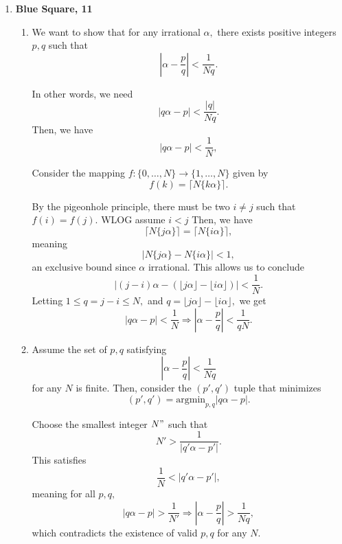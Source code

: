 \documentclass[12pt]{article}
\begin{document}
\begin{enumerate}
    Thus, by the pigeonhole principle there must be at least one
    consecutive non-empty block that is a perfect square.

  \item \textbf{Blue Square, 11}
    \begin{enumerate}
      \item We want to show that for any irrational $\alpha,$ there
        exists positive integers $p, q$ such that
        $$
        \left|\alpha - \dfrac{p}{q}\right| < \dfrac{1}{Nq}.
        $$

        In other words, we need
        $$
        |q\alpha - p| < \dfrac{|q|}{Nq}.
        $$
        Then, we have
        $$
        |q \alpha - p| < \dfrac{1}{N},
        $$

        Consider the mapping $f : \{0, \ldots, N\} \to \{1, \ldots,
        N\}$ given by
        $$
        f(k) = \lceil N \{k \alpha\} \rceil.
        $$

        By the pigeonhole principle, there must be two $i \neq j$
        such that $f(i) = f(j).$ WLOG assume $i < j$ Then, we have
        $$
        \lceil N\{j \alpha\} \rceil = \lceil N\{i \alpha \}\rceil,
        $$
        meaning
        $$
        |N\{j \alpha\}-N\{i \alpha\}| < 1,
        $$
        an exclusive bound since $\alpha$ irrational. This allows us to conclude
        $$
        | (j-i) \alpha - (\lfloor j \alpha \rfloor - \lfloor i \alpha
        \rfloor)| < \dfrac{1}{N}.
        $$
        Letting $1 \leq q = j - i \leq N,$ and $q = \lfloor j \alpha
        \rfloor - \lfloor i \alpha \rfloor,$ we get
        $$
        |q \alpha - p| < \dfrac{1}{N} \Rightarrow \left|\alpha -
        \dfrac{p}{q}\right| < \dfrac{1}{qN}.
        $$

      \item Assume the set of $p, q$ satisfying
        $$
        \left|\alpha  - \dfrac{p}{q}\right| < \dfrac{1}{Nq}
        $$
        for any $N$ is finite. Then, consider the $(p', q')$ tuple
        that minimizes
        $$
        (p', q') = \text{argmin}_{p, q} \left|q\alpha - p\right|.
        $$

        Choose the smallest integer $N"$ such that $$N' >
        \dfrac{1}{|q'\alpha - p'|}.$$ This satisfies
        $$
        \dfrac{1}{N} < \left|q'\alpha - p'\right|,
        $$
        meaning for all $p, q,$
        $$
        |q\alpha - p| > \dfrac{1}{N'} \Rightarrow \left|\alpha -
        \dfrac{p}{q}\right| > \dfrac{1}{Nq},
        $$
        which contradicts the existence of valid $p, q$ for any $N.$


\end{enumerate}
\end{enumerate}
\end{document}
